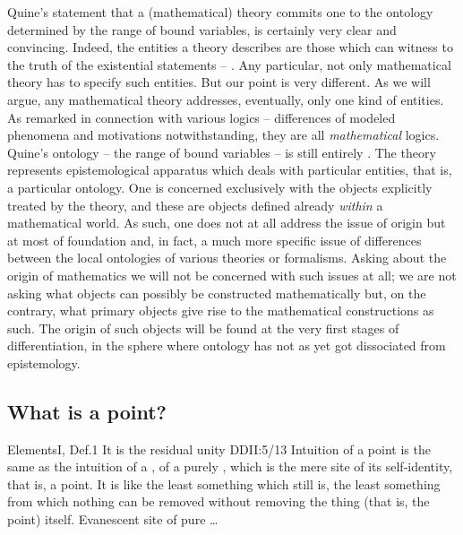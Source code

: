 Quine's statement that a (mathematical) theory commits one to the ontology
determined by the range of bound variables, is certainly very clear and
convincing.  Indeed, the entities a theory describes are those which can witness
to the truth of the existential statements -- . Any particular, not only mathematical theory has to specify
such entities.  But our point is very different. As we will argue, any
mathematical theory addresses, eventually, only one kind of entities.
As remarked in connection with various logics -- differences of modeled
phenomena and motivations notwithstanding, they are all {\em mathematical}
logics.  Quine's ontology -- the range of bound variables -- is still entirely
. The theory represents epistemological apparatus which deals
with particular entities, that is, a particular ontology. One is
concerned exclusively with the objects 
explicitly treated by the theory, and these are objects defined already {\em
  within} a mathematical world. As such, one does not at all address the issue
of origin but at most of foundation and, in fact, a much more specific issue of
differences between the local ontologies of various theories or formalisms.
Asking about the origin of mathematics we will not be concerned with such issues
at all; we are not asking what objects can possibly be constructed
mathematically but, on the contrary, what primary objects give rise to the
mathematical constructions as such. The origin of such objects will be found at
the very first stages of differentiation, in the sphere where ontology has not
as yet got dissociated from epistemology.


\subsection{What is a point?} %
\pa\label{pa:pointA} \citet{A point is that which has no part.}{Elements}{I,
  Def.1} It is the residual unity \citet{beyond which there cannot be anything
  less.}{DDI}{I:5/13} Intuition of a point is the same as the intuition of a
, of a purely , which is the mere site of its
self-identity, that is, a point.  It is like the least something which still is,
the least something from which nothing can be removed without removing the thing
(that is, the point) itself. Evanescent site of pure \ldots


